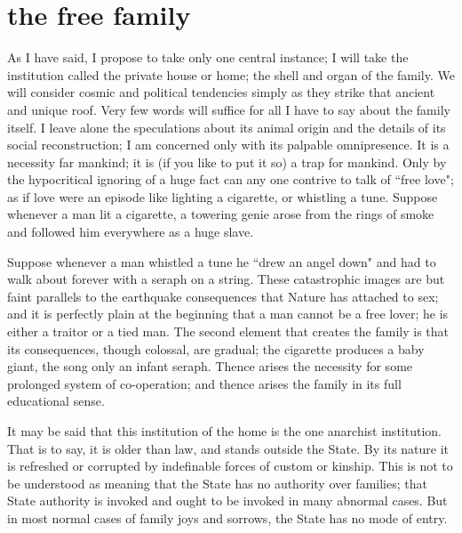\documentclass[final,10pt,letterpaper,twocolumn,openany]{book}
\begin{document}
\section{the free family}

     As I have said, I propose to take only one central instance; I will take
the institution called the private house or home; the shell and organ of the
family. We will consider cosmic and political tendencies simply as they
strike that ancient and unique roof. Very few words will suffice for all I
have to say about the family itself. I leave alone the speculations about its
animal origin and the details of its social reconstruction; I am concerned
only with its palpable omnipresence. It is a necessity far mankind; it is (if
you like to put it so) a trap for mankind. Only by the hypocritical ignoring
of a huge fact can any one contrive to talk of ``free love"; as if love were
an episode like lighting a cigarette, or whistling a tune. Suppose whenever
a man lit a cigarette, a towering genie arose from the rings of smoke and
followed him everywhere as a huge slave. 

Suppose whenever a man
whistled a tune he ``drew an angel down" and had to walk about forever
with a seraph on a string. These catastrophic images are but faint parallels
to the earthquake consequences that Nature has attached to sex; and it is
perfectly plain at the beginning that a man cannot be a free lover; he is
either a traitor or a tied man. The second element that creates the family is
that its consequences, though colossal, are gradual; the cigarette produces
a baby giant, the song only an infant seraph. Thence arises the necessity
for some prolonged system of co-operation; and thence arises the family in
its full educational sense.

It may be said that this institution of the home is the one anarchist
institution. That is to say, it is older than law, and stands outside the State.
By its nature it is refreshed or corrupted by indefinable forces of custom or
kinship. This is not to be understood as meaning that the State has no
authority over families; that State authority is invoked and ought to be
invoked in many abnormal cases. But in most normal cases of family joys
and sorrows, the State has no mode of entry. 
\end{document}
